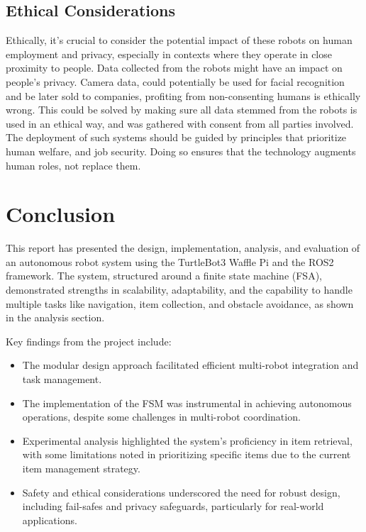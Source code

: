 \documentclass[conference]{IEEEtran}
\begin{document}
\subsection{Ethical Considerations}
Ethically, it's crucial to consider the potential impact of these robots on human employment and privacy, especially in contexts where they operate in close proximity to people.
Data collected from the robots might have an impact on people's privacy. Camera data, could potentially be used for facial recognition and be later sold to companies, profiting from non-consenting humans is ethically wrong. This could be solved by making sure all data stemmed from the robots is used in an ethical way, and was gathered with consent from all parties involved.
The deployment of such systems should be guided by principles that prioritize human welfare, and job security. Doing so ensures that the technology augments human roles, not replace them.

\section{Conclusion}
This report has presented the design, implementation, analysis, and evaluation of an autonomous robot system using the TurtleBot3 Waffle Pi and the ROS2 framework. The system, structured around a finite state machine (FSA), demonstrated strengths in scalability, adaptability, and the capability to handle multiple tasks like navigation, item collection, and obstacle avoidance, as shown in the analysis section.

Key findings from the project include:
\begin{itemize}
    \item The modular design approach facilitated efficient multi-robot integration and task management.
    \item The implementation of the FSM was instrumental in achieving autonomous operations, despite some challenges in multi-robot coordination.
    \item Experimental analysis highlighted the system’s proficiency in item retrieval, with some limitations noted in prioritizing specific items due to the current item management strategy.
    \item Safety and ethical considerations underscored the need for robust design, including fail-safes and privacy safeguards, particularly for real-world applications.
\end{itemize}
\end{document}
